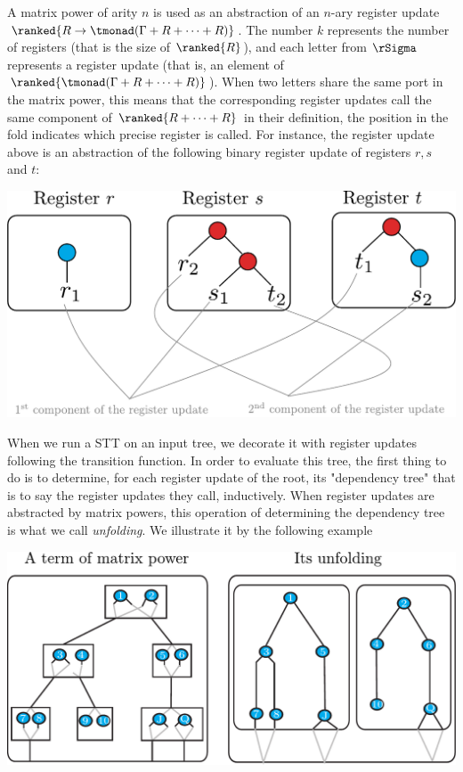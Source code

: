 A matrix power of arity $n$ is used as an abstraction of an $n$-ary register update $\ranked{R\to \tmonad(\Gamma+R+\dots+R)}$. The number $k$ represents the number of registers (that is the size of $\ranked {R}$), and each letter from $\rSigma$ represents a register update (that is, an element of $\ranked{\tmonad(\Gamma+R+\dots+R)}$). When two letters share the same port in the matrix power, this means that the corresponding register updates call the same component of $\ranked{R+\dots+R}$ in their definition, the position in the fold indicates which precise register is called. For instance, the register update above is an abstraction of the following binary register update of registers $r, s$ and $t$:
   \begin{center}
   \includegraphics[scale=.3]{register-update-matrix-power.pdf}
   \end{center}
When we run a STT on an input tree, we decorate it with register updates following the transition function. In order to evaluate this tree, the first thing to do is to determine, for each register update of the root, its "dependency tree" that is to say the register updates they call, inductively. When register updates are abstracted by matrix powers, this operation of determining the dependency tree is what we call \emph{unfolding}. We illustrate it by the following example 
\begin{center}
\includegraphics[scale=.38]{unfold-matrix-power}
\end{center}

